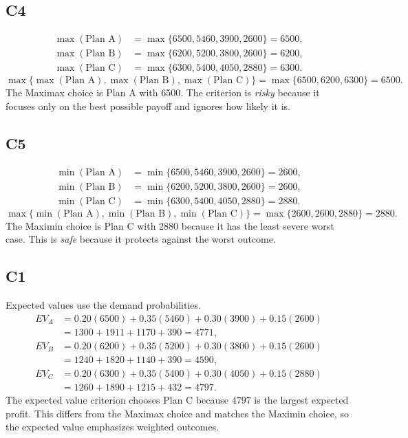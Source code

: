 \begin{ExamProblems}
			\subsection*{C4}
			\[
			\begin{aligned}
			\max(\text{Plan A}) &= \max\{6500,5460,3900,2600\} = 6500,\\
			\max(\text{Plan B}) &= \max\{6200,5200,3800,2600\} = 6200,\\
			\max(\text{Plan C}) &= \max\{6300,5400,4050,2880\} = 6300.
			\end{aligned}
			\]
			\[
			\max\{\max(\text{Plan A}), \max(\text{Plan B}), \max(\text{Plan C})\}
			= \max\{6500, 6200, 6300\}
			= 6500.
			\]
			The Maximax choice is Plan A with 6500. The criterion is \emph{risky} because it focuses only on the best possible payoff and ignores how likely it is.
	
			\subsection*{C5}
			\[
			\begin{aligned}
			\min(\text{Plan A}) &= \min\{6500,5460,3900,2600\} = 2600,\\
			\min(\text{Plan B}) &= \min\{6200,5200,3800,2600\} = 2600,\\
			\min(\text{Plan C}) &= \min\{6300,5400,4050,2880\} = 2880.
			\end{aligned}
			\]
			\[
			\max\{\min(\text{Plan A}), \min(\text{Plan B}), \min(\text{Plan C})\}
			= \max\{2600, 2600, 2880\}
			= 2880.
			\]
			The Maximin choice is Plan C with 2880 because it has the least severe worst case. This is \emph{safe} because it protects against the worst outcome.
	
			\subsection*{C1}
			Expected values use the demand probabilities.
			\[
			\begin{aligned}
			EV_A &= 0.20(6500)+0.35(5460)+0.30(3900)+0.15(2600)\\
			&= 1300+1911+1170+390=4771,\\
			EV_B &= 0.20(6200)+0.35(5200)+0.30(3800)+0.15(2600)\\
			&= 1240+1820+1140+390=4590,\\
			EV_C &= 0.20(6300)+0.35(5400)+0.30(4050)+0.15(2880)\\
			&= 1260+1890+1215+432=4797.
			\end{aligned}
			\]
			The expected value criterion chooses Plan C because $4797$ is the largest expected profit. This differs from the Maximax choice and matches the Maximin choice, so the expected value emphasizes weighted outcomes.
	

\end{ExamProblems}
